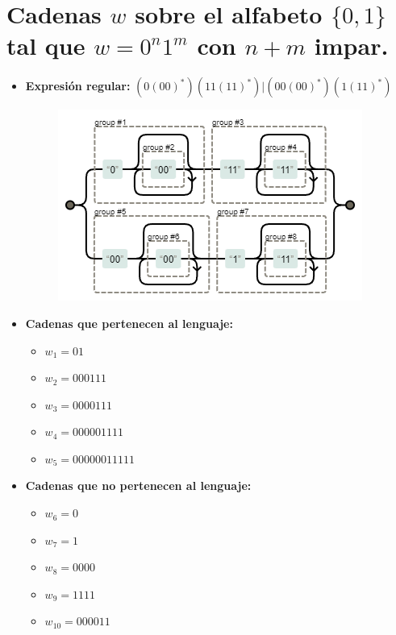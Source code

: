 \documentclass[11pt]{report}
\begin{document}
\section{Cadenas $w$ sobre el alfabeto \texorpdfstring{$\{0, 1\}$}{\{0, 1\}} tal que $w = 0^n1^m$ con $n + m$ impar.}
\begin{itemize}
  \item \textbf{Expresión regular:} $(0(00)^*)(11(11)^*)|(00(00)^*)(1(11)^*)$
    \begin{figure}[H]
      \centering
      \includegraphics[scale=0.9]{img/op_basicos_08.png}
    \end{figure}
  \item \textbf{Cadenas que pertenecen al lenguaje: }
    \begin{itemize}
      \item $w_1 = 01$
      \item $w_2 = 000111$
      \item $w_3 = 0000111$
      \item $w_4 = 000001111$
      \item $w_5 = 00000011111$
    \end{itemize}
  \item \textbf{Cadenas que no pertenecen al lenguaje: }
    \begin{itemize}
      \item $w_6 = 0$
      \item $w_7 = 1$
      \item $w_8 = 0000$
      \item $w_9 = 1111$
      \item $w_{10} = 000011$
    \end{itemize}
\end{itemize}

\newpage
\end{document}
